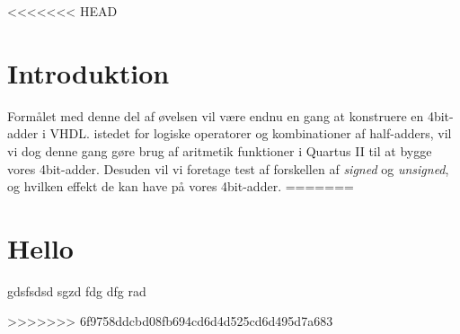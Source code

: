 \documentclass[../journal2.tex]{subfiles}
\begin{document}
<<<<<<< HEAD
\section{Introduktion}
Formålet med denne del af øvelsen vil være endnu en gang at konstruere en 4bit-adder i VHDL. istedet for logiske operatorer og kombinationer af half-adders, vil vi dog denne gang gøre brug af aritmetik funktioner i Quartus II til at bygge vores 4bit-adder. Desuden vil vi foretage test af forskellen af \textit{signed} og \textit{unsigned}, og hvilken effekt de kan have på vores 4bit-adder.
=======
\section{Hello}

gdsfsdsd 
sgzd fdg dfg rad









>>>>>>> 6f9758ddcbd08fb694cd6d4d525cd6d495d7a683
\end{document}
